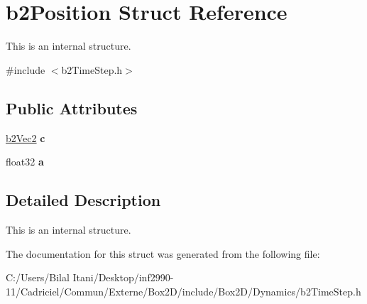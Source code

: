 \hypertarget{structb2_position}{}\section{b2\+Position Struct Reference}
\label{structb2_position}


This is an internal structure.  




{\ttfamily \#include $<$b2\+Time\+Step.\+h$>$}

\subsection*{Public Attributes}
\begin{DoxyCompactItemize}
\item 
\hyperlink{structb2_vec2}{b2\+Vec2} {\bfseries c}\hypertarget{structb2_position_a64b6d764d272385f84e4cac5ceb5af27}{}\label{structb2_position_a64b6d764d272385f84e4cac5ceb5af27}

\item 
float32 {\bfseries a}\hypertarget{structb2_position_a19d9362011e8c080059ac7f692cc7d8f}{}\label{structb2_position_a19d9362011e8c080059ac7f692cc7d8f}

\end{DoxyCompactItemize}


\subsection{Detailed Description}
This is an internal structure. 

The documentation for this struct was generated from the following file\+:\begin{DoxyCompactItemize}
\item 
C\+:/\+Users/\+Bilal Itani/\+Desktop/inf2990-\/11/\+Cadriciel/\+Commun/\+Externe/\+Box2\+D/include/\+Box2\+D/\+Dynamics/b2\+Time\+Step.\+h\end{DoxyCompactItemize}
